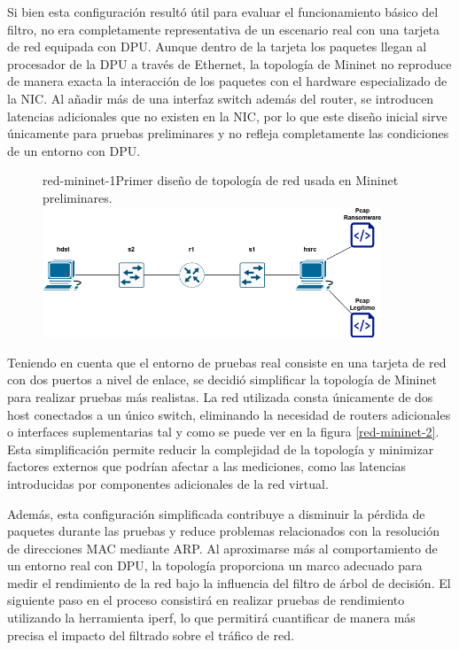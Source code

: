 Si bien esta configuración resultó útil para evaluar el funcionamiento básico del filtro, no era completamente representativa de un escenario real con una tarjeta de red equipada con DPU. Aunque dentro de la tarjeta los paquetes llegan al procesador de la DPU a través de Ethernet, la topología de Mininet no reproduce de manera exacta la interacción de los paquetes con el hardware especializado de la NIC. Al añadir más de una interfaz switch además del router, se introducen latencias adicionales que no existen en la NIC, por lo que este diseño inicial sirve únicamente para pruebas preliminares y no refleja completamente las condiciones de un entorno con DPU.

\begin{figure}[Primera Topología de Red]{red-mininet-1}{Primer diseño de topología de red usada en Mininet preliminares.}
	\includegraphics[width=0.9\textwidth]{capturas/DiagramaRedArbol1.png}
\end{figure}

Teniendo en cuenta que el entorno de pruebas real consiste en una tarjeta de red con dos puertos a nivel de enlace, se decidió simplificar la topología de Mininet para realizar pruebas más realistas. La red utilizada consta únicamente de dos host conectados a un único switch, eliminando la necesidad de routers adicionales o interfaces suplementarias tal y como se puede ver en la figura \ref{red-mininet-2}. Esta simplificación permite reducir la complejidad de la topología y minimizar factores externos que podrían afectar a las mediciones, como las latencias introducidas por componentes adicionales de la red virtual.

Además, esta configuración simplificada contribuye a disminuir la pérdida de paquetes durante las pruebas y reduce problemas relacionados con la resolución de direcciones MAC mediante ARP. Al aproximarse más al comportamiento de un entorno real con DPU, la topología proporciona un marco adecuado para medir el rendimiento de la red bajo la influencia del filtro de árbol de decisión. El siguiente paso en el proceso consistirá en realizar pruebas de rendimiento utilizando la herramienta iperf, lo que permitirá cuantificar de manera más precisa el impacto del filtrado sobre el tráfico de red.

